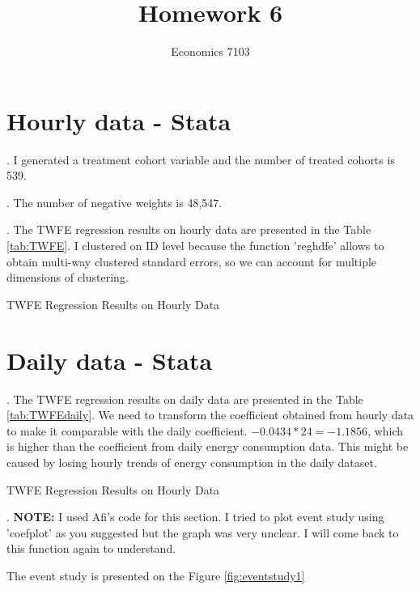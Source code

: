\documentclass{article}
\title{Homework 6}
\author{Economics 7103}
\begin{document}
  
\maketitle

\section{Hourly data - Stata}
. I generated a treatment cohort variable and the number of treated cohorts is 539.

. The number of negative weights is  48,547.

. The TWFE regression results on hourly data are presented in the Table \ref{tab:TWFE}. I clustered on ID level because the function 'reghdfe' allows to obtain multi-way clustered standard errors, so we can account for multiple dimensions of clustering. 

\begin{table}[h]
    \centering
    
    \caption{TWFE Regression Results on Hourly Data}
    \label{tab:TWFE}
\end{table}

\clearpage

\section{Daily data - Stata}

. The TWFE regression results on daily data are presented in the Table \ref{tab:TWFEdaily}. We need to transform the coefficient obtained from hourly data to make it comparable with the daily coefficient. $-0.0434 * 24 = -1.1856$, which is higher than the coefficient from daily energy consumption data. This might be caused by losing hourly trends of energy consumption in the daily dataset. 


\begin{table}[h]
    \centering
    
    \caption{TWFE Regression Results on Hourly Data}
    \label{tab:TWFEdaily}
\end{table}

\clearpage

. \textbf{NOTE: }I used Afi's code for this section. I tried to plot event study using 'coefplot' as you suggested but the graph was very unclear. I will come back to this function again to understand. 

The event study is presented on the Figure \ref{fig:eventstudy1}
\end{document}
